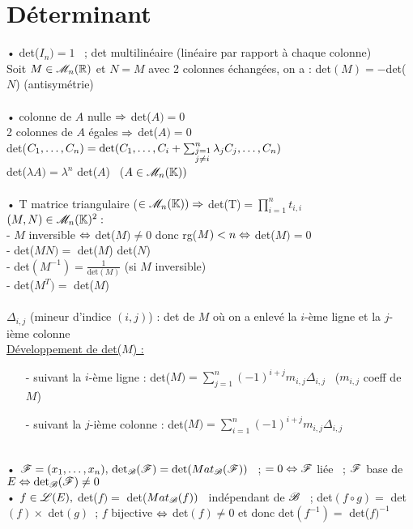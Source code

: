 \documentclass[12 pt]{exampleclass}
\begin{document}
\section{Déterminant}

\begin{flushleft}
\begin{doublespace}

	• det($I_n) = 1$ \ ; det multilinéaire (linéaire par rapport à chaque colonne)\\
	Soit $M\in \mathscr{M}_n(\mathbb{R})$ et $N = M$ avec 2 colonnes échangées, on a : det$(M) = -$det($N$) (antisymétrie)\\
	
	\text{ }\\
	• colonne de $A$ nulle $\Rightarrow$ det($A) = 0$\\
	2 colonnes de $A$ égales $\Rightarrow$ det($A) = 0$\\
	det($C_1,\dots,C_n) = \text{det}(C_1, \dots, C_i + \sum_{\begin{subarray}{l} j=1 \\ j \ne i \end{subarray}}^n \lambda_j C_j , \dots, C_n)$\\
	det($\lambda A) = \lambda^n$ det($A$) \ ($A\in\mathscr{M}_n(\mathbb{K}))$\\
	
	\text{ }\\
	• T matrice triangulaire ($\in\mathscr{M}_n(\mathbb{K})) \Rightarrow$ det(T)$ = \prod_{i = 1}^n t_{i,i}$\\
	$(M,N)\in\mathscr{M}_n(\mathbb{K})^2 :$\\
	- $M$ inversible $\Leftrightarrow$ det($M) \ne 0$ donc rg($M) < n \Leftrightarrow$ det($M) = 0$\\
     - det($MN) = $ det($M$) det($N$)\\
	- det$(M^{-1}) = \frac{1}{\text{det}(M)}$ \; (si $M$ inversible)\\
	- det($M^T) =$ det($M$)\\
	\text{ }\\
	$\Delta_{i,j}$ (mineur d'indice $(i,j)$) : det de $M$ où on a enlevé la $i$-ème ligne et la $j$-ième colonne\\
	\underline{Développement de det($M$) :}\\
	\begin{itemize}
		\item[-] suivant la $i$-ème ligne : det($M) = \sum\limits_{j = 1}^n (- 1)^{i +j} m_{i,j} \Delta_{i,j}$ \ ($m_{i,j}$ coeff de $M$)
		\item[-]suivant la $j$-ième colonne : det($M) = \sum\limits_{i = 1}^n (- 1)^{i +j} m_{i,j} \Delta_{i,j}$ 
	\end{itemize}
	\text{}\\
	• $\mathscr{F} = (x_1, \dots, x_n),\, \text{det}_{\mathscr{B}}(\mathscr{F}) = \text{det}(Mat_{\mathscr{B}}(\mathscr{F}))$ \ ; $= 0 \Leftrightarrow \mathscr{F}$ liée \ ; $\mathscr{F}$ base de $E \Leftrightarrow \text{det}_{\mathscr{B}}(\mathscr{F}) \ne 0$\\	
	• $f\in\mathscr{L}(E),$ det($f) =$ det($Mat_{\mathscr{B}}(f))$\ \warning\; indépendant de $\mathscr{B}$ \ ; det$(f\circ g) =$ det$(f) \times$ det$(g)$\ ; $f$ bijective $\Leftrightarrow$ det$(f) \ne 0$ et donc det$(f^{- 1}) =$ det($f)^{- 1}$\\

\end{doublespace}
\end{flushleft}
\end{document}
